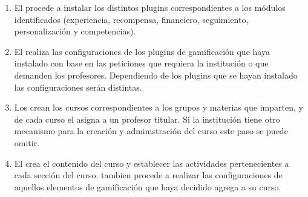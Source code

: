  \begin{enumerate}



  \item El  procede a instalar los distintos plugins
        correspondientes a los módulos identificados (experiencia, recompensa,
        financiero, seguimiento, personalización y competencias).

  \item El  realiza las configuraciones de los plugins
        de gamificación que haya instalado con base en las peticiones que requiera
        la institución o que demanden los profesores. Dependiendo de los plugins
        que se hayan instalado las configuraciones serán distintas.

  \item Los  crean los cursos correspondientes a
        los grupos y materias que imparten, y de cada curso el  asigna a un profesor titular. Si la institución tiene
        otro mecanismo para la creación y administración del curso este paso se
        puede omitir.

  \item El  crea el contenido del curso y establecer las
        actividades pertenecientes a cada sección del curso. tambien procede
        a realizar las configuraciones de aquellos elementos de gamificación
        que haya decidido agrega a su curso.


\end{enumerate}
